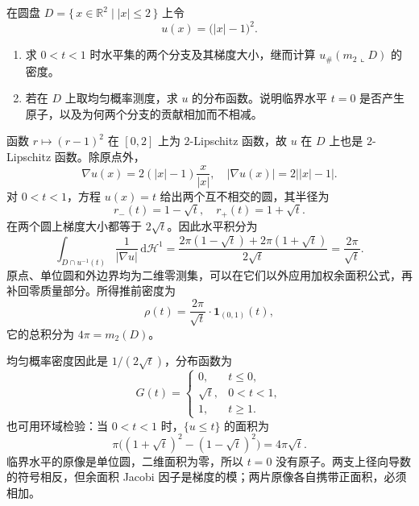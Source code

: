 \begin{exercise}\label{b1:ex:18-folded-radial-levels}
在圆盘 \(D=\{\,x\in\mathbb R^2\mid |x|\le2\,\}\) 上令
\[
 u(x)=\bigl(|x|-1\bigr)^2.
\]
\begin{enumerate}
\item\label{b1:item:18-folded-level-density}
求 \(0<t<1\) 时水平集的两个分支及其梯度大小，继而计算 \(u_\#(m_2\llcorner D)\) 的密度。
\item\label{b1:item:18-folded-distribution}
若在 \(D\) 上取均匀概率测度，求 \(u\) 的分布函数。说明临界水平 \(t=0\) 是否产生原子，以及为何两个分支的贡献相加而不相减。
\end{enumerate}
\end{exercise}
\begin{solution}
函数 \(r\mapsto(r-1)^2\) 在 \([0,2]\) 上为 \(2\)-Lipschitz 函数，故 \(u\) 在 \(D\) 上也是 \(2\)-Lipschitz 函数。除原点外，
\[
 \nabla u(x)=2(|x|-1)\frac{x}{|x|},
 \quad |\nabla u(x)|=2\bigl||x|-1\bigr|.
\]
对 \(0<t<1\)，方程 \(u(x)=t\) 给出两个互不相交的圆，其半径为
\[
 r_-(t)=1-\sqrt t,
 \quad r_+(t)=1+\sqrt t.
\]
在两个圆上梯度大小都等于 \(2\sqrt t\)。因此水平积分为
\[
 \int_{D\cap u^{-1}(t)}\frac1{|\nabla u|}\,\mathrm d\mathcal H^1
 =\frac{2\pi(1-\sqrt t)+2\pi(1+\sqrt t)}{2\sqrt t}
 =\frac{2\pi}{\sqrt t}.
\]
原点、单位圆和外边界均为二维零测集，可以在它们以外应用加权余面积公式，再补回零质量部分。所得推前密度为
\[
 \rho(t)=\frac{2\pi}{\sqrt t}\cdot\mathbf1_{(0,1)}(t),
\]
它的总积分为 \(4\pi=m_2(D)\)。

均匀概率密度因此是 \(1/(2\sqrt t)\)，分布函数为
\[
 G(t)=
 \begin{cases}
 0,&t\le0,\\
 \sqrt t,&0<t<1,\\
 1,&t\ge1.
 \end{cases}
\]
也可用环域检验：当 \(0<t<1\) 时，\(\{u\le t\}\) 的面积为
\[
 \pi\bigl((1+\sqrt t)^2-(1-\sqrt t)^2\bigr)=4\pi\sqrt t.
\]
临界水平的原像是单位圆，二维面积为零，所以 \(t=0\) 没有原子。两支上径向导数的符号相反，但余面积 Jacobi 因子是梯度的模；两片原像各自携带正面积，必须相加。
\end{solution}

